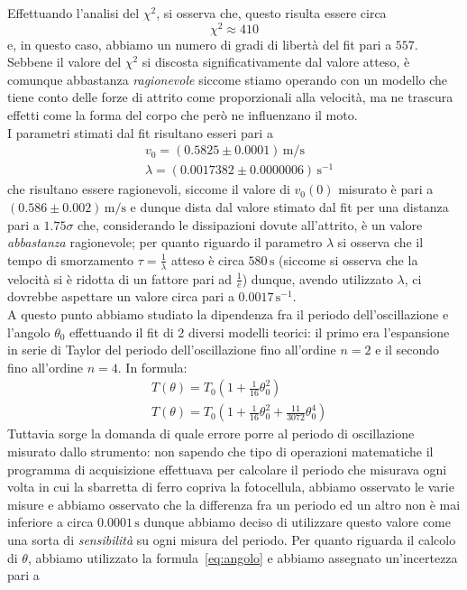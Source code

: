 \documentclass{article}
\begin{document}
\noindent Effettuando l'analisi del $\chi^2$, si osserva che, questo risulta essere circa
$$
	\chi^2 \approx 410
$$
e, in questo caso, abbiamo un numero di gradi di libertà del fit pari a $557$. Sebbene il valore del $\chi^2$ si discosta significativamente dal valore atteso, è comunque abbastanza \emph{ragionevole} siccome stiamo operando con un modello che tiene conto delle forze di attrito come proporzionali alla velocità, ma ne trascura effetti come la forma del corpo che però ne influenzano il moto. \\
I parametri stimati dal fit risultano esseri pari a
\begin{align}
	&v_0 = (0.5825 \pm 0.0001) \, \si{\meter\per\second} \\
	&\lambda = (0.0017382 \pm 0.0000006)\, \si{\second^{-1}}
\end{align}
che risultano essere ragionevoli, siccome il valore di $v_0(0)$ misurato è pari a $(0.586 \pm 0.002) \, \si{\meter\per\second}$ e dunque dista dal valore stimato dal fit per una distanza pari a $1.75\sigma$ che, considerando le dissipazioni dovute all'attrito, è un valore \emph{abbastanza} ragionevole; per quanto riguardo il parametro $\lambda$ si osserva che il tempo di smorzamento $\tau = \frac{1}{\lambda}$ atteso è circa $580 \, \si{\second}$ (siccome si osserva che la velocità si è ridotta di un fattore pari ad $\frac{1}{e}$) dunque, avendo utilizzato $\lambda$, ci dovrebbe aspettare un valore circa pari a $0.0017 \, \si{\second^{-1}}$. \\
A questo punto abbiamo studiato la dipendenza fra il periodo dell'oscillazione e l'angolo $\theta_0$ effettuando il fit di 2 diversi modelli teorici: il primo era l'espansione in serie di Taylor del periodo dell'oscillazione fino all'ordine $n=2$ e il secondo fino all'ordine $n=4$. In formula:
\begin{align}
	&T(\theta) = T_0 \left(1 + \frac{1}{16}\theta_0^2 \right) \\
	&T(\theta) = T_0 \left(1 + \frac{1}{16}\theta_0^2 + \frac{11}{3072}\theta_0^4 \right)
\end{align}
Tuttavia sorge la domanda di quale errore porre al periodo di oscillazione misurato dallo strumento: non sapendo che tipo di operazioni matematiche il programma di acquisizione effettuava per calcolare il periodo che misurava ogni volta in cui la sbarretta di ferro copriva la fotocellula, abbiamo osservato le varie misure e abbiamo osservato che la differenza fra un periodo ed un altro non è mai inferiore a circa $0.0001 \, \si{\second}$ dunque abbiamo deciso di utilizzare questo valore come \clearpage \noindent una sorta di \emph{sensibilità} su ogni misura del periodo. Per quanto riguarda il calcolo di $\theta$, abbiamo utilizzato la  formula~\ref{eq:angolo} e abbiamo assegnato un'incertezza pari a
\end{document}
